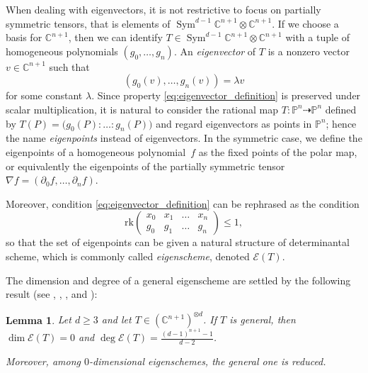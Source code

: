 \documentclass{amsart}
\theoremstyle{plain}
\newtheorem{lemma}{Lemma}[section]
\theoremstyle{definition}
\newcommand{\C}{\mathbb{C}}
\newcommand{\p}{\mathbb{P}}
\newcommand{\de}{\partial}
\newcommand{\Eig}[1]{\mathcal{E}\!\left( {#1} \right)}
\newcommand{\Sym}{\operatorname{Sym}}
\newcommand{\rk}{\ensuremath{\mathrm{rk}}}
\begin{document}
When dealing with eigenvectors, it is not restrictive to focus on partially symmetric tensors, that is elements of $\Sym^{d-1}\C^{n+1}\otimes\C^{n+1}$.
 If we choose a basis for $\C^{n+1}$, then we can identify $T\in \Sym^{d-1}\C^{n+1}\otimes\C^{n+1}$ with a tuple of homogeneous polynomials $(g_0,\dots,g_n)$. An \emph{eigenvector} of $T$ is a nonzero vector $v\in\C^{n+1}$ such that
%
\begin{equation}\label{eq:eigenvector_definition}
(g_0(v), \ldots, g_n(v))=\lambda v
\end{equation}
for some constant $\lambda$.
%
Since %
property \eqref{eq:eigenvector_definition} is preserved under scalar multiplication, it is natural to consider the rational map $T \colon \p^n\dashrightarrow\p^n$ defined by $T(P)=\bigl(g_0(P):\ldots:g_n(P)\bigr)$ and regard eigenvectors as points in $\p^n$; hence the name \emph{eigenpoints} instead of eigenvectors. In the symmetric case, we define the eigenpoints of a homogeneous polynomial~$f$ as the fixed points of the polar map, or equivalently the eigenpoints of the partially symmetric tensor $\nabla f = (\de_0f,\dots,\de_n f)$.

Moreover, condition \eqref{eq:eigenvector_definition} can be rephrased as the condition
\begin{equation}
\label{eq:def_matrix_general}
    \rk \begin{pmatrix}
    x_0 & x_1 & \dots & x_n \\
    g_0 & g_1 & \dots & g_n
    \end{pmatrix} \le 1,
\end{equation}
so that the set of eigenpoints can be given a natural structure of determinantal scheme, which is commonly called \emph{eigenscheme}, denoted $\Eig{T}$.

The dimension and degree of a general eigenscheme are settled by the following result (see \cite[Theorem 2.1]{CartSturm}, \cite{ASS}, \cite{OO}, and \cite[Equation~5.2]{Abo}):

\begin{lemma}\label{lem:nonempty}
Let $d\ge 3$ and let $T \in (\C^{n+1})^{\otimes d}$.
If $T$ is general, then $\dim \Eig{T}=0$ and $\deg \Eig{T}=\frac{(d-1)^{n+1}-1}{d-2}$.

Moreover, among $0$-dimensional eigenschemes, the general one is reduced.
\end{lemma}
\end{document}

